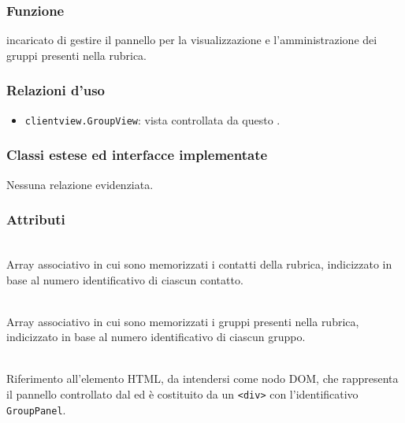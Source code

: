 
\subsubsection*{Funzione}
 incaricato di gestire il pannello per la visualizzazione e l'amministrazione dei gruppi presenti nella rubrica.

\subsubsection*{Relazioni d'uso}
\begin{itemize}
  \item \texttt{clientview.GroupView}: vista controllata da questo .
\end{itemize}

\subsubsection*{Classi estese ed interfacce implementate}
Nessuna relazione evidenziata.

\subsubsection*{Attributi}
\begin{description}

  \item{}\\
  Array associativo in cui sono memorizzati i contatti della rubrica, indicizzato in base al numero identificativo di ciascun contatto.
  
  \item{}\\
  Array associativo in cui sono memorizzati i gruppi presenti nella rubrica, indicizzato in base al numero identificativo di ciascun gruppo.
  
  \item{}\\
  Riferimento all'elemento HTML, da intendersi come nodo DOM, che rappresenta il pannello controllato dal  ed è costituito da un \verb'<div>' con l'identificativo \verb'GroupPanel'.
  
\end{description}

